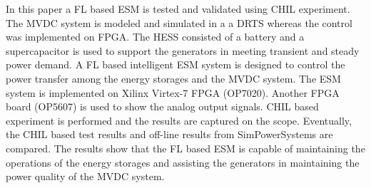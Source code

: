 In this paper a FL based ESM is tested and validated using CHIL experiment. The MVDC system is modeled and simulated in a a DRTS whereas the control was implemented on FPGA. The HESS consisted of a battery and a supercapacitor is used to support the generators in meeting transient and steady power demand. A FL based intelligent ESM system is designed to control the power transfer among the energy storages and the MVDC system. The ESM system is implemented on Xilinx Virtex-7 FPGA (OP7020). Another FPGA board (OP5607) is used to show the analog output signals. CHIL based experiment is performed and the results are captured on the scope. Eventually, the CHIL based test results and off-line results from SimPowerSystems are compared. The results show that the FL based ESM is capable of maintaining the operations of the energy storages and assisting the generators in maintaining the power quality of the MVDC system.   


